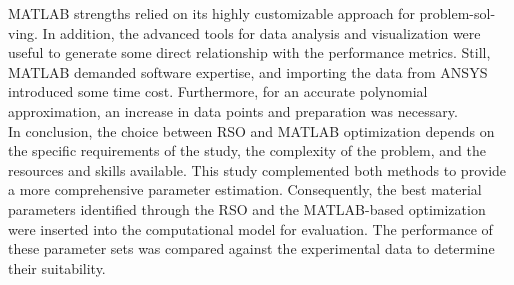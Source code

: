 MATLAB strengths relied on its highly customizable approach for problem-sol-\\ving. 
In addition, the advanced tools for data 
analysis and visualization were useful to generate some direct relationship with the performance metrics. Still, 
MATLAB demanded software expertise, and importing the data from ANSYS introduced some time cost. Furthermore, for an 
accurate polynomial approximation, an increase in data points and preparation was necessary.\\

In conclusion, the choice between RSO and MATLAB optimization depends on the specific requirements of the study, 
the complexity of the problem, and the resources and skills available. 
This study complemented both methods to provide a more comprehensive parameter estimation.
Consequently, the best material parameters identified through the RSO and the MATLAB-based optimization were 
inserted into the computational model for evaluation. The performance of these parameter sets was compared against 
the experimental data to determine their suitability.

%






